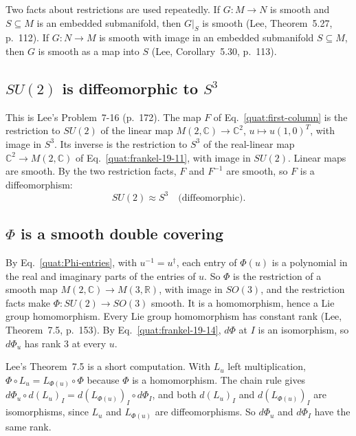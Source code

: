 Two facts about restrictions are used repeatedly. If $G\colon M\to N$ is
smooth and $S\subseteq M$ is an embedded submanifold, then $G|_S$ is smooth
(Lee, Theorem~5.27, p.~112). If $G\colon N\to M$ is smooth with image in an
embedded submanifold $S\subseteq M$, then $G$ is smooth as a map into $S$
(Lee, Corollary~5.30, p.~113).

\subsection{\texorpdfstring{$SU(2)$}{SU(2)} is diffeomorphic to \texorpdfstring{$S^3$}{S3}}
This is Lee's Problem~7-16 (p.~172). The map $F$ of
Eq.~\eqref{quat:first-column} is the restriction to $SU(2)$ of the linear map
$M(2,\mathbb C)\to\mathbb C^2$, $u\mapsto u(1,0)^T$, with image in $S^3$. Its
inverse is the restriction to $S^3$ of the real-linear map
$\mathbb C^2\to M(2,\mathbb C)$ of Eq.~\eqref{quat:frankel-19-11}, with image
in $SU(2)$. Linear maps are smooth. By the two restriction facts, $F$ and
$F^{-1}$ are smooth, so $F$ is a diffeomorphism:
\begin{equation}\label{quat:SU2-diffeo-S3}
 SU(2)\approx S^3\quad\text{(diffeomorphic)}.
\end{equation}

\subsection{\texorpdfstring{$\Phi$}{Phi} is a smooth double covering}
By Eq.~\eqref{quat:Phi-entries}, with $u^{-1}=u^\dagger$, each entry of
$\Phi(u)$ is a polynomial in the real and imaginary parts of the entries of
$u$. So $\Phi$ is the restriction of a smooth map $M(2,\mathbb C)\to
M(3,\mathbb R)$, with image in $SO(3)$, and the restriction facts make
$\Phi\colon SU(2)\to SO(3)$ smooth. It is a homomorphism, hence a Lie group
homomorphism. Every Lie group homomorphism has constant rank (Lee,
Theorem~7.5, p.~153). By Eq.~\eqref{quat:frankel-19-14}, $d\Phi$ at $I$ is an
isomorphism, so $d\Phi_u$ has rank $3$ at every $u$.

Lee's Theorem~7.5 is a short computation. With $L_u$ left multiplication,
$\Phi\circ L_u=L_{\Phi(u)}\circ\Phi$ because $\Phi$ is a homomorphism. The
chain rule gives $d\Phi_u\circ d(L_u)_I=d(L_{\Phi(u)})_I\circ d\Phi_I$, and
both $d(L_u)_I$ and $d(L_{\Phi(u)})_I$ are isomorphisms, since $L_u$ and
$L_{\Phi(u)}$ are diffeomorphisms. So $d\Phi_u$ and $d\Phi_I$ have the same
rank.

